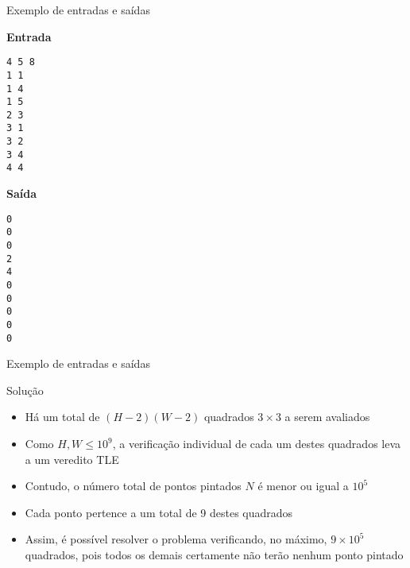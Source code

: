 \begin{frame}[fragile]{Exemplo de entradas e saídas}

\begin{minipage}[t]{0.55\textwidth}
\textbf{Entrada}
\begin{verbatim}
4 5 8
1 1
1 4
1 5
2 3
3 1
3 2
3 4
4 4
\end{verbatim}
\end{minipage}
\begin{minipage}[t]{0.4\textwidth}
\textbf{Saída}
\begin{verbatim}
0
0
0
2
4
0
0
0
0
0
\end{verbatim}
\end{minipage}
\end{frame}

\begin{frame}[fragile]{Exemplo de entradas e saídas}

    \begin{figure}
        \centering


    \end{figure}

\end{frame}


\begin{frame}[fragile]{Solução}

    \begin{itemize}
        \item Há um total de $(H - 2)(W - 2)$ quadrados $3\times 3$ a serem avaliados

        \item Como $H, W\leq 10^9$, a verificação individual de cada um destes quadrados leva a
            um veredito TLE

        \item Contudo, o número total de pontos pintados $N$ é menor ou igual a $10^5$

        \item Cada ponto pertence a um total de 9 destes quadrados

        \item Assim, é possível resolver o problema verificando, no máximo, $9\times 10^5$
            quadrados, pois todos os demais certamente não terão nenhum ponto pintado

    \end{itemize}

\end{frame}


